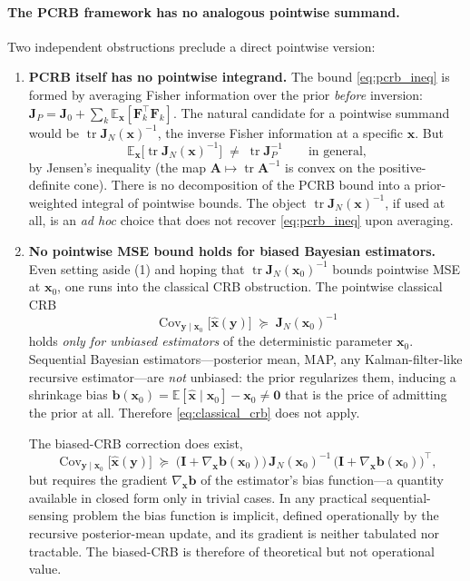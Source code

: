 \documentclass[11pt,a4paper]{article}
\newcommand{\E}{\mathbb{E}}
\newcommand{\tr}{\operatorname{tr}}
\newcommand{\Cov}{\operatorname{Cov}}
\begin{document}
\paragraph{The PCRB framework has no analogous pointwise summand.}  Two independent obstructions preclude a direct pointwise version:

\begin{enumerate}[leftmargin=2em, nosep]

\item \textbf{PCRB itself has no pointwise integrand.}  The bound \eqref{eq:pcrb_ineq} is formed by averaging Fisher information over the prior \emph{before} inversion: $\bm{J}_P = \bm{J}_0 + \sum_k \E_{\bm{x}}[\bm{F}_k^\top \bm{F}_k]$.  The natural candidate for a pointwise summand would be $\tr \bm{J}_N(\bm{x})^{-1}$, the inverse Fisher information at a specific $\bm{x}$.  But
\begin{equation}
  \E_{\bm{x}}\!\bigl[\tr \bm{J}_N(\bm{x})^{-1}\bigr] \;\neq\; \tr \bm{J}_P^{-1}
  \qquad\text{in general,}
\end{equation}
by Jensen's inequality (the map $\bm{A} \mapsto \tr \bm{A}^{-1}$ is convex on the positive-definite cone).  There is no decomposition of the PCRB bound into a prior-weighted integral of pointwise bounds.  The object $\tr \bm{J}_N(\bm{x})^{-1}$, if used at all, is an \emph{ad hoc} choice that does not recover \eqref{eq:pcrb_ineq} upon averaging.

\item \textbf{No pointwise MSE bound holds for biased Bayesian estimators.}  Even setting aside (1) and hoping that $\tr \bm{J}_N(\bm{x}_0)^{-1}$ bounds pointwise MSE at $\bm{x}_0$, one runs into the classical CRB obstruction.  The pointwise classical CRB
\begin{equation}
  \Cov_{\bm{y}\mid\bm{x}_0}\!\bigl[\hat{\bm{x}}(\bm{y})\bigr] \;\succeq\; \bm{J}_N(\bm{x}_0)^{-1}
  \label{eq:classical_crb}
\end{equation}
holds \emph{only for unbiased estimators} of the deterministic parameter $\bm{x}_0$.  Sequential Bayesian estimators---posterior mean, MAP, any Kalman-filter-like recursive estimator---are \emph{not} unbiased: the prior regularizes them, inducing a shrinkage bias $\bm{b}(\bm{x}_0) = \E[\hat{\bm{x}}\mid \bm{x}_0] - \bm{x}_0 \neq \bm{0}$ that is the price of admitting the prior at all.  Therefore \eqref{eq:classical_crb} does not apply.

The biased-CRB correction does exist,
\begin{equation}
  \Cov_{\bm{y}\mid\bm{x}_0}\!\bigl[\hat{\bm{x}}(\bm{y})\bigr] \;\succeq\; \bigl(\bm{I} + \nabla_{\bm{x}}\bm{b}(\bm{x}_0)\bigr)\, \bm{J}_N(\bm{x}_0)^{-1}\, \bigl(\bm{I} + \nabla_{\bm{x}}\bm{b}(\bm{x}_0)\bigr)^\top,
\end{equation}
but requires the gradient $\nabla_{\bm{x}}\bm{b}$ of the estimator's bias function---a quantity available in closed form only in trivial cases.  In any practical sequential-sensing problem the bias function is implicit, defined operationally by the recursive posterior-mean update, and its gradient is neither tabulated nor tractable.  The biased-CRB is therefore of theoretical but not operational value.


\end{enumerate}
\end{document}
